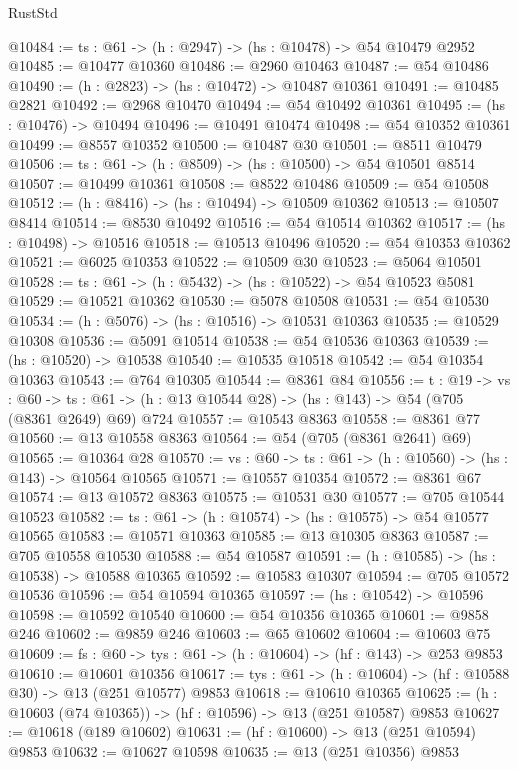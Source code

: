 \begin{lexlean}{RustStd}
\begin{coremodule}
@10484 := {ts : @61} -> (h : @2947) -> (hs : @10478) -> @54 @10479 @2952
@10485 := @10477 @10360
@10486 := @2960 @10463
@10487 := @54 @10486
@10490 := (h : @2823) -> (hs : @10472) -> @10487 @10361
@10491 := @10485 @2821
@10492 := @2968 @10470
@10494 := @54 @10492 @10361
@10495 := (hs : @10476) -> @10494
@10496 := @10491 @10474
@10498 := @54 @10352 @10361
@10499 := @8557 @10352
@10500 := @10487 @30
@10501 := @8511 @10479
@10506 := {ts : @61} -> (h : @8509) -> (hs : @10500) -> @54 @10501 @8514
@10507 := @10499 @10361
@10508 := @8522 @10486
@10509 := @54 @10508
@10512 := (h : @8416) -> (hs : @10494) -> @10509 @10362
@10513 := @10507 @8414
@10514 := @8530 @10492
@10516 := @54 @10514 @10362
@10517 := (hs : @10498) -> @10516
@10518 := @10513 @10496
@10520 := @54 @10353 @10362
@10521 := @6025 @10353
@10522 := @10509 @30
@10523 := @5064 @10501
@10528 := {ts : @61} -> (h : @5432) -> (hs : @10522) -> @54 @10523 @5081
@10529 := @10521 @10362
@10530 := @5078 @10508
@10531 := @54 @10530
@10534 := (h : @5076) -> (hs : @10516) -> @10531 @10363
@10535 := @10529 @10308
@10536 := @5091 @10514
@10538 := @54 @10536 @10363
@10539 := (hs : @10520) -> @10538
@10540 := @10535 @10518
@10542 := @54 @10354 @10363
@10543 := @764 @10305
@10544 := @8361 @84
@10556 := {t : @19} ->
  {vs : @60} ->
  {ts : @61} -> (h : @13 @10544 @28) -> (hs : @143) -> @54 (@705 (@8361 @2649) @69) @724
@10557 := @10543 @8363
@10558 := @8361 @77
@10560 := @13 @10558 @8363
@10564 := @54 (@705 (@8361 @2641) @69)
@10565 := @10364 @28
@10570 := {vs : @60} -> {ts : @61} -> (h : @10560) -> (hs : @143) -> @10564 @10565
@10571 := @10557 @10354
@10572 := @8361 @67
@10574 := @13 @10572 @8363
@10575 := @10531 @30
@10577 := @705 @10544 @10523
@10582 := {ts : @61} -> (h : @10574) -> (hs : @10575) -> @54 @10577 @10565
@10583 := @10571 @10363
@10585 := @13 @10305 @8363
@10587 := @705 @10558 @10530
@10588 := @54 @10587
@10591 := (h : @10585) -> (hs : @10538) -> @10588 @10365
@10592 := @10583 @10307
@10594 := @705 @10572 @10536
@10596 := @54 @10594 @10365
@10597 := (hs : @10542) -> @10596
@10598 := @10592 @10540
@10600 := @54 @10356 @10365
@10601 := @9858 @246
@10602 := @9859 @246
@10603 := @65 @10602
@10604 := @10603 @75
@10609 := {fs : @60} -> {tys : @61} -> (h : @10604) -> (hf : @143) -> @253 @9853
@10610 := @10601 @10356
@10617 := {tys : @61} -> (h : @10604) -> (hf : @10588 @30) -> @13 (@251 @10577) @9853
@10618 := @10610 @10365
@10625 := (h : @10603 (@74 @10365)) -> (hf : @10596) -> @13 (@251 @10587) @9853
@10627 := @10618 (@189 @10602)
@10631 := (hf : @10600) -> @13 (@251 @10594) @9853
@10632 := @10627 @10598
@10635 := @13 (@251 @10356) @9853

\end{coremodule}
\end{lexlean}
